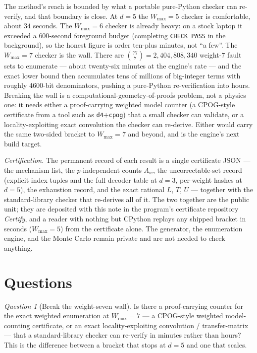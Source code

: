 \documentclass[11pt]{amsart}
\newcommand{\WMAX}{W_{\max}}
\theoremstyle{plain}
\theoremstyle{definition}
\theoremstyle{remark}
\newtheorem{question}[theorem]{Question}
\begin{document}
The method's reach is bounded by what a portable pure-Python checker can
re-verify, and that boundary is close. At $d=5$ the $\WMAX=5$ checker is
comfortable, about $34$ seconds. The $\WMAX=6$ checker is already heavy: on a
stock laptop it exceeded a $600$-second foreground budget (completing
\texttt{CHECK PASS} in the background), so the honest figure is order ten-plus
minutes, not ``a few''. The $\WMAX=7$ checker is the wall. There are
$\binom{77}{7}=2{,}404{,}808{,}340$ weight-$7$ fault sets to enumerate --- about
twenty-six minutes at the engine's rate --- and the exact lower bound then
accumulates tens of millions of big-integer terms with roughly $4600$-bit
denominators, pushing a pure-Python re-verification into hours. Breaking the
wall is a computational-geometry-of-proofs problem, not a physics one: it needs
either a proof-carrying weighted model counter (a CPOG-style certificate from a
tool such as \texttt{d4}$+$\texttt{cpog}) that a small checker can validate, or
a locality-exploiting exact convolution the checker can re-derive. Either would
carry the same two-sided bracket to $\WMAX=7$ and beyond, and is the engine's
next build target.

\emph{Certification.} The permanent record of each result is a single
certificate JSON --- the mechanism list, the $p$-independent counts $A_w$, the
uncorrectable-set record (explicit index tuples and the full decoder table at
$d=3$, per-weight hashes at $d=5$), the exhaustion record, and the exact
rational $L$, $T$, $U$ --- together with the standard-library checker that
re-derives all of it. The two together are the public unit; they are deposited
with this note in the program's certificate repository \emph{Certify}, and a
reader with nothing but CPython replays any shipped bracket in seconds
($\WMAX=5$) from the certificate alone. The generator, the enumeration engine,
and the Monte Carlo remain private and are not needed to check anything.

\section{Questions}\label{sec:questions}

\begin{question}[Break the weight-seven wall]\label{q:seven}
Is there a proof-carrying counter for the exact weighted enumeration at
$\WMAX=7$ --- a CPOG-style weighted model-counting certificate, or an exact
locality-exploiting convolution / transfer-matrix --- that a standard-library
checker can re-verify in minutes rather than hours? This is the difference
between a bracket that stops at $d=5$ and one that scales.
\end{question}
\end{document}

